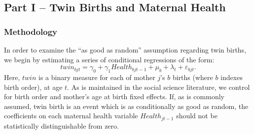 \documentclass[subeqn]{article}
\begin{document}
\begin{spacing}{1.4}



\part*{Part I -- Twin Births and Maternal Health}
\section{Methodology}
\label{TWINscn:method}
In order to examine the ``as good as random'' assumption regarding twin births,
we begin by estimating a series of conditional regressions of the form:
\begin{equation}
  \label{TWINeqn:twinreg}
  twin_{bjt}=\gamma_0 + \gamma_1 Health_{bjt-1} + \mu_b + \lambda_t
            + \varepsilon_{bjt}.
\end{equation}
Here, $twin$ is a binary measure for each of mother $j$'s $b$ births (where $b$
indexes birth order), at age $t$.  As is maintained in the social science
literature, we control for birth order and mother's age at birth fixed effects.
If, as is commonly assumed, twin birth is an event which is as conditionally as
good as random, the coefficients on each maternal health variable
$Health_{jt-1}$ should not be statistically distinguishable from zero.


\end{spacing}
\end{document}
